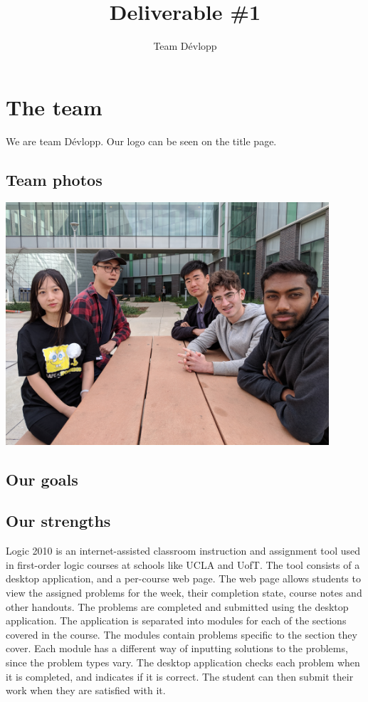 \documentclass[12pt]{scrreprt}
\title{Deliverable \#1}
\author{Team D\'evlopp}
\begin{document}
\maketitle
\tableofcontents

\section{The team}
We are team D\'evlopp. Our logo can be seen on the title page.

\subsection{Team photos}
\includegraphics[width=0.9\textwidth]{team.jpg}


\subsection{Our goals}

\subsection{Our strengths}
Logic 2010 is an internet-assisted classroom instruction and assignment tool used in first-order logic courses at schools like UCLA and UofT. The tool consists of a desktop application, and a per-course web page. The web page allows students to view the assigned problems for the week, their completion state, course notes and other handouts. The problems are completed and submitted using the desktop application. The application is separated into modules for each of the sections covered in the course. The modules contain problems specific to the section they cover. Each module has a different way of inputting solutions to the problems, since the problem types vary. The desktop application checks each problem when it is completed, and indicates if it is correct. The student can then submit their work when they are satisfied with it.
\end{document}
